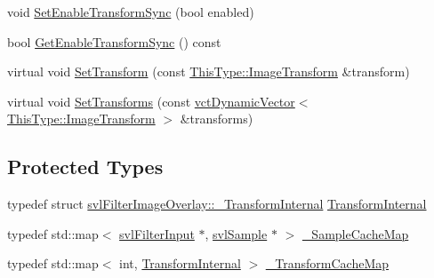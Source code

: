 \begin{DoxyCompactItemize}
void \hyperlink{classsvl_filter_image_overlay_acfb8f04ba2e62df2d5ef285d2ca35f96}{Set\+Enable\+Transform\+Sync} (bool enabled)
\item 
bool \hyperlink{classsvl_filter_image_overlay_a1a70af2f7458fed3895f30249ff56480}{Get\+Enable\+Transform\+Sync} () const 
\item 
virtual void \hyperlink{classsvl_filter_image_overlay_afefde4a1ee3a1f8c5fecf29efa67c14f}{Set\+Transform} (const \hyperlink{classsvl_filter_image_overlay_a68354a171b2498de3aa1c5ba0ff2f002}{This\+Type\+::\+Image\+Transform} \&transform)
\item 
virtual void \hyperlink{classsvl_filter_image_overlay_a031a9989f7ea4d9ac45fa7664163baaf}{Set\+Transforms} (const \hyperlink{classvct_dynamic_vector}{vct\+Dynamic\+Vector}$<$ \hyperlink{classsvl_filter_image_overlay_a68354a171b2498de3aa1c5ba0ff2f002}{This\+Type\+::\+Image\+Transform} $>$ \&transforms)
\end{DoxyCompactItemize}
\subsection*{Protected Types}
\begin{DoxyCompactItemize}
\item 
typedef struct \hyperlink{structsvl_filter_image_overlay_1_1___transform_internal}{svl\+Filter\+Image\+Overlay\+::\+\_\+\+Transform\+Internal} \hyperlink{classsvl_filter_image_overlay_a18061cddeca5ead367351cc833ce7c4e}{Transform\+Internal}
\item 
typedef std\+::map$<$ \hyperlink{classsvl_filter_input}{svl\+Filter\+Input} $\ast$, \hyperlink{classsvl_sample}{svl\+Sample} $\ast$ $>$ \hyperlink{classsvl_filter_image_overlay_a0cb98a1b14141d0a0940656ebec8d3ea}{\+\_\+\+Sample\+Cache\+Map}
\item 
typedef std\+::map$<$ int, \hyperlink{classsvl_filter_image_overlay_a18061cddeca5ead367351cc833ce7c4e}{Transform\+Internal} $>$ \hyperlink{classsvl_filter_image_overlay_ae7f68bdaad7a6718f5d38e99099fd1a4}{\+\_\+\+Transform\+Cache\+Map}
\end{DoxyCompactItemize}
